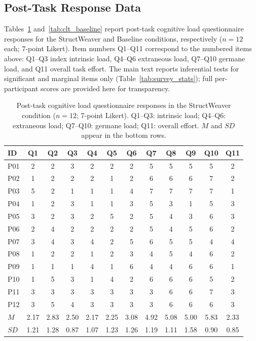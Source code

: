 \documentclass[manuscript,review,anonymous]{acmart}
\begin{document}
\subsection{Post-Task Response Data}
\label{appendix:posttask-clt}

Tables~\ref{tab:clt_structweaver} and~\ref{tab:clt_baseline} report post-task cognitive load questionnaire responses for the StructWeaver and Baseline conditions, respectively ($n=12$ each; 7-point Likert). Item numbers Q1--Q11 correspond to the numbered items above: Q1--Q3 index intrinsic load, Q4--Q6 extraneous load, Q7--Q10 germane load, and Q11 overall task effort. The main text reports inferential tests for significant and marginal items only (Table~\ref{tab:survey_stats}); full per-participant scores are provided here for transparency.

\begin{table}[t]
\centering
\caption{Post-task cognitive load questionnaire responses in the StructWeaver condition ($n=12$; 7-point Likert). Q1--Q3: intrinsic load; Q4--Q6: extraneous load; Q7--Q10: germane load; Q11: overall effort. $M$ and $SD$ appear in the bottom rows.}
\label{tab:clt_structweaver}
\small
\setlength{\tabcolsep}{4pt}
\begin{tabular}{lccccccccccc}
\toprule
\textbf{ID} & \textbf{Q1} & \textbf{Q2} & \textbf{Q3} & \textbf{Q4} & \textbf{Q5} & \textbf{Q6} & \textbf{Q7} & \textbf{Q8} & \textbf{Q9} & \textbf{Q10} & \textbf{Q11} \\
\midrule
P01 & 2 & 2 & 3 & 2 & 2 & 2 & 5 & 5 & 5 & 5 & 2 \\
P02 & 1 & 2 & 2 & 2 & 1 & 2 & 6 & 6 & 6 & 7 & 2 \\
P03 & 5 & 2 & 1 & 1 & 1 & 4 & 7 & 7 & 7 & 7 & 1 \\
P04 & 1 & 2 & 3 & 1 & 1 & 3 & 5 & 3 & 1 & 5 & 3 \\
P05 & 3 & 2 & 3 & 2 & 5 & 2 & 5 & 4 & 3 & 6 & 3 \\
P06 & 2 & 4 & 2 & 2 & 2 & 2 & 5 & 4 & 5 & 6 & 2 \\
P07 & 3 & 4 & 3 & 4 & 2 & 5 & 6 & 5 & 5 & 4 & 4 \\
P08 & 1 & 2 & 2 & 1 & 2 & 3 & 4 & 5 & 4 & 6 & 2 \\
P09 & 1 & 1 & 1 & 4 & 1 & 6 & 4 & 4 & 6 & 6 & 1 \\
P10 & 1 & 5 & 3 & 1 & 4 & 2 & 6 & 6 & 6 & 5 & 2 \\
P11 & 3 & 3 & 3 & 3 & 3 & 3 & 3 & 6 & 6 & 7 & 3 \\
P12 & 3 & 5 & 4 & 3 & 3 & 3 & 3 & 6 & 6 & 6 & 3 \\
\midrule
$M$ & 2.17 & 2.83 & 2.50 & 2.17 & 2.25 & 3.08 & 4.92 & 5.08 & 5.00 & 5.83 & 2.33 \\
$SD$ & 1.21 & 1.28 & 0.87 & 1.07 & 1.23 & 1.26 & 1.19 & 1.11 & 1.58 & 0.90 & 0.85 \\
\bottomrule
\end{tabular}
\end{table}
\end{document}
